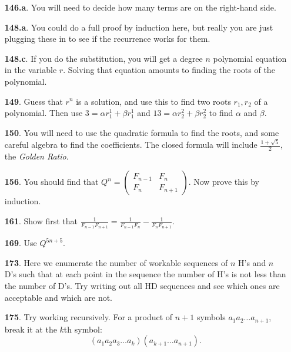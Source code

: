 \documentclass[10pt,]{book}
\theoremstyle{plain}
\theoremstyle{definition}
\theoremstyle{definition}
\theoremstyle{definition}
\numberwithin{equation}{chapter}
\newcommand{\amp}{&}
\begin{document}
\begin{itemize}[itemsep=1em]
\item[\textbf{146.a}.]\hypertarget{p-939}{}%
You will need to decide how many terms are on the right-hand side.%

\item[\textbf{148.a}.]\hypertarget{p-948}{}%
You could do a full proof by induction here, but really you are just plugging these in to see if the recurrence works for them.%

\item[\textbf{148.c}.]\hypertarget{p-951}{}%
If you do the substitution, you will get a degree \(n\) polynomial equation in the variable \(r\).  Solving that equation amounts to finding the roots of the polynomial.%

\item[\textbf{149}.]\hypertarget{p-954}{}%
Guess that \(r^n\) is a solution, and use this to find two roots \(r_1, r_2\) of a polynomial.  Then use \(3 = \alpha r_1^1 + \beta r_1^1\) and \(13 = \alpha r_2^2 + \beta r_2^2\) to find \(\alpha\) and \(\beta\).%

\item[\textbf{150}.]\hypertarget{p-956}{}%
You will need to use the quadratic formula to find the roots, and some careful algebra to find the coefficients.  The closed formula will include \(\frac{1+\sqrt{5}}{2}\), the \emph{Golden Ratio}.%

\item[\textbf{156}.]\hypertarget{p-969}{}%
You should find that \(Q^n = \begin{pmatrix}
F_{n - 1} \amp F_{n}\\
F_{n} \amp F_{n + 1}
\end{pmatrix}\).  Now prove this by induction.%

\item[\textbf{161}.]\hypertarget{p-975}{}%
Show first that \(\frac{1}{F_{n - 1}F_{n + 1}} = \frac{1}{F_{n - 1}F_{n}} -
\frac{1}{F_{n}F_{n + 1}}\).%

\item[\textbf{169}.]\hypertarget{p-984}{}%
Use \(Q^{5n + 5}\).%

\item[\textbf{173}.]\hypertarget{p-993}{}%
Here we enumerate the number of workable sequences of \(n\) H's and \(n\) D's such that at each point in the sequence the number of H's is not less than the number of D's.  Try writing out all HD sequences and see which ones are acceptable and which are not.%

\item[\textbf{175}.]\hypertarget{p-999}{}%
Try working recursively.   For a product of \(n+1\) symbols \(a_{1}a_{2}\ldots a_{n+1}\), break it at the \(k\)th symbol:%
\begin{equation*}
(a_{1}a_{2}a_{3}\ldots a_{k})(a_{k + 1}\ldots a_{n+1}).
\end{equation*}
%


\end{itemize}
\end{document}

